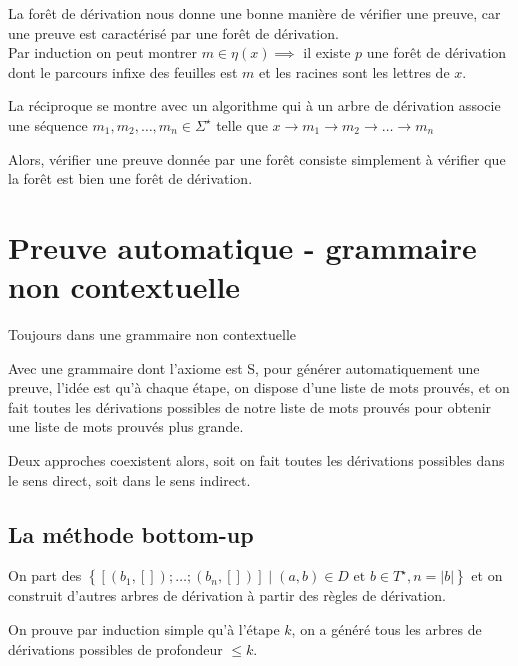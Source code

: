 \documentclass[a4paper,12pt]{article}
\newcommand{\norm}[1]{\lvert #1 \rvert}
\begin{document}
La forêt de dérivation nous donne une bonne manière de vérifier une preuve, car une preuve est caractérisé par une forêt de dérivation.\\

Par induction on peut montrer $m \in \eta(x) \implies $ il existe $p$ une forêt de dérivation dont le parcours infixe des feuilles est $m$ et les racines sont les lettres de $x$.




 


La réciproque se montre avec un algorithme qui à un arbre de dérivation associe une séquence $m_1,m_2,\dots,m_n \in \Sigma^\star$ telle que $x \rightarrow m_1 \rightarrow m_2 \rightarrow \dots \rightarrow m_n$







Alors, vérifier une preuve donnée par une forêt consiste simplement à vérifier que la forêt est bien une forêt de dérivation.

\section{Preuve automatique - grammaire non contextuelle}

Toujours dans une grammaire non contextuelle

Avec une grammaire dont l'axiome est S,
pour générer automatiquement une preuve, l'idée est qu'à chaque étape,
on dispose d'une liste de mots prouvés,
et on fait toutes les dérivations possibles de notre liste de mots prouvés pour obtenir une liste de mots prouvés plus grande.

Deux approches coexistent alors, soit on fait toutes les dérivations possibles dans le sens direct, soit dans le sens indirect.

\subsection{La méthode bottom-up}

On part des $\left\{ [(b_1,[]);\dots;(b_n,[])] \mid (a,b)\in D \text{ et } b \in T^\star , n = \norm{b}\right\}$ et on construit d'autres arbres de dérivation à partir des règles de dérivation.


On prouve par induction simple qu'à l'étape $k$, on a généré tous les arbres de dérivations possibles de profondeur $\leq k$.
\end{document}
